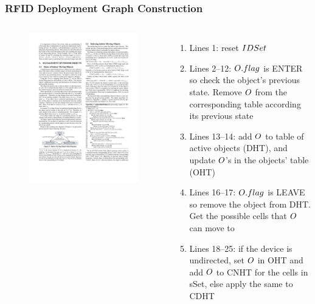 \begin{frame}
\frametitle{RFID Deployment Graph Construction}

\begin{columns}[c]

    \begin{figure}[tb]
      \includegraphics[width=\columnwidth]{figures/2-2/2-2-4.pdf}
    \end{figure}

  \scriptsize{
    \begin{enumerate}
      \item Lines 1: \textrm{reset $\mathnormal{IDSet}$} \pause
      \item Lines 2--12: \textrm{$\mathnormal{O.flag}$ is ENTER so check the object's previous state. Remove $\mathnormal{O}$ from the corresponding table according its previous state} \pause
      \item Lines 13--14: \textrm{add $\mathnormal{O}$ to table of active objects (DHT), and update $\mathnormal{O}$'s in the objects' table (OHT)} \pause
      \item Lines 16--17: \textrm{$\mathnormal{O.flag}$ is LEAVE so remove the object from DHT. Get the possible cells that $\mathnormal{O}$ can move to} \pause
      \item Lines 18--25: \textrm{if the device is undirected, set $\mathnormal{O}$ in OHT and add $\mathnormal{O}$ to CNHT for the cells in sSet, else apply the same to CDHT}
    \end{enumerate}
  }
  \end{columns}


\end{frame}

